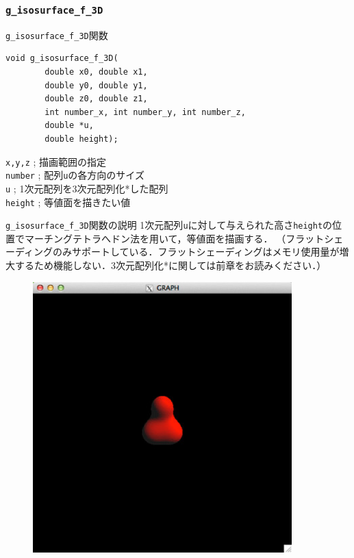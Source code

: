 \documentclass[platex,a4paper,12pt]{jsarticle}%
\begin{document}
\begin{figure}[htb]
\end{figure}


\clearpage
\subsubsection{\texttt{g\_isosurface\_f\_3D}}

\begin{itembox}[l]{\texttt{g\_isosurface\_f\_3D}関数}
\begin{verbatim}
void g_isosurface_f_3D(
        double x0, double x1,
        double y0, double y1,
        double z0, double z1,
        int number_x, int number_y, int number_z,
        double *u,
        double height);
\end{verbatim}
\verb|x,y,z| ; 描画範囲の指定\\
\verb|number| ; 配列\verb|u|の各方向のサイズ\\
\verb|u| ; 1次元配列を3次元配列化*した配列\\
\verb|height| ; 等値面を描きたい値
\end{itembox}

\begin{itembox}[l]{\texttt{g\_isosurface\_f\_3D}関数の説明}
1次元配列\verb|u|に対して与えられた高さ\verb|height|の位置でマーチングテトラへドン法を用いて，等値面を描画する．
（フラットシェーディングのみサポートしている．フラットシェーディングはメモリ使用量が増大するため機能しない．3次元配列化*に関しては前章をお読みください．）
\end{itembox}

\begin{figure}[htb]
\centering
	\includegraphics[width=100mm]{Canvas_g_isosurface.eps}
\end{figure}
\end{document}
